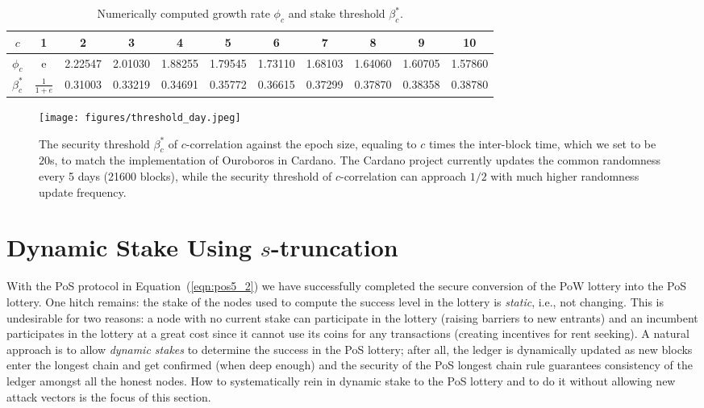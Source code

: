 \documentclass{article}
\begin{document}
\begin{table}[h]
\begin{center}
\begin{tabular}{ |c|c|c|c|c|c|c|c|c|c|c| }
 \hline
 $c$      & 1 & 2 & 3 & 4 & 5 & 6 & 7 & 8 & 9 & 10\\ \hline
 $\phi_c$   & e & 2.22547  & 2.01030 & 1.88255  & 1.79545  & 1.73110 & 1.68103 & 1.64060 &1.60705 & 1.57860 \\
 \hline
 $\beta^*_c$ & $\frac{1}{1+e}$& 0.31003 & 0.33219 &0.34691 &0.35772 & 0.36615 & 0.37299 &
 0.37870 & 0.38358 & 0.38780
 \\ \hline
\end{tabular}
\end{center}
\caption{Numerically computed growth rate $\phi_c$ and stake threshold $\beta^*_c$.}
\end{table}

\begin{figure}
    \centering
    \texttt{[image: figures/threshold\_day.jpeg]}
    \caption{The security threshold $\beta^*_c$ of $c$-correlation against the epoch size, equaling to $c$ times the inter-block time, which we set to be $20$s, to match the implementation of Ouroboros in Cardano. The Cardano project currently updates the common randomness every 5 days (21600 blocks), while the security threshold of $c$-correlation can approach $1/2$ with much higher randomness update frequency.}
    \label{fig:threshold_day}
\end{figure}

\section*{Dynamic Stake Using $s$-truncation}
With the PoS protocol in Equation~(\ref{eqn:pos5_2}) we have successfully completed the secure conversion of the PoW lottery into the PoS lottery. One hitch remains: the stake of the nodes used to compute the success level in the lottery is {\em static}, i.e., not changing. This is undesirable for two reasons: a node with no current stake can participate in the lottery (raising barriers to new entrants) and an incumbent participates in the lottery at a great cost since it cannot use its coins for any transactions (creating incentives for rent seeking). A natural approach is to allow {\em dynamic stakes} to determine the success in the PoS lottery; after all, the ledger is dynamically updated as new blocks enter the longest chain and get confirmed (when deep enough) and the security of the PoS longest chain rule guarantees consistency of the ledger amongst all the honest nodes. How to systematically rein in dynamic stake to the PoS lottery and to do it without allowing new attack vectors is the focus of this section. 
\end{document}
